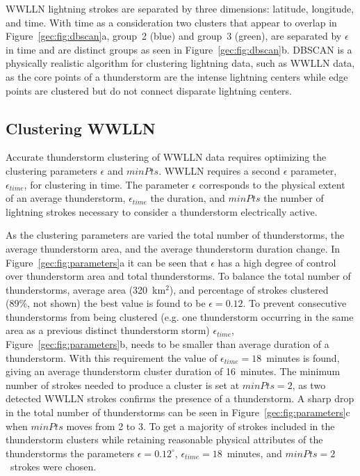 WWLLN lightning strokes are separated by three dimensions: latitude, longitude, and time.
With time as a consideration two clusters that appear to overlap in Figure~\ref{gec:fig:dbscan}a, group~2 (blue) and group~3 (green), are separated by $\epsilon$ in time and are distinct groups as seen in Figure~\ref{gec:fig:dbscan}b.
DBSCAN is a physically realistic algorithm for clustering lightning data, such as WWLLN data, as the core points of a thunderstorm are the intense lightning centers while edge points are clustered but do not connect disparate lightning centers.

\subsection{Clustering WWLLN}

Accurate thunderstorm clustering of WWLLN data requires optimizing the clustering parameters $\epsilon$ and $minPts$.
WWLLN requires a second $\epsilon$ parameter, $\epsilon_{time}$, for clustering in time.
The parameter $\epsilon$ corresponds to the physical extent of an average thunderstorm, $\epsilon_{time}$ the duration, and $minPts$ the number of lightning strokes necessary to consider a thunderstorm electrically active.

As the clustering parameters are varied the total number of thunderstorms, the average thunderstorm area, and the average thunderstorm duration change.
In Figure~\ref{gec:fig:parameters}a it can be seen that $\epsilon$ has a high degree of control over thunderstorm area and total thunderstorms.
To balance the total number of thunderstorms, average area (320~km$^2$), and percentage of strokes clustered (89\%, not shown) the best value is found to be $\epsilon = 0.12$.
To prevent consecutive thunderstorms from being clustered (e.g. one thunderstorm occurring in the same area as a previous distinct thunderstorm storm) $\epsilon_{time}$, Figure~\ref{gec:fig:parameters}b, needs to be smaller than average duration of a thunderstorm.
With this requirement the value of $\epsilon_{time} = 18$~minutes is found, giving an average thunderstorm cluster duration of 16~minutes.
The minimum number of strokes needed to produce a cluster is set at $minPts = 2$, as two detected WWLLN strokes confirms the presence of a thunderstorm.
A sharp drop in the total number of thunderstorms can be seen in Figure~\ref{gec:fig:parameters}c when $minPts$ moves from 2 to 3.
To get a majority of strokes included in the thunderstorm clusters while retaining reasonable physical attributes of the thunderstorms the parameters $\epsilon = 0.12^\circ$, $\epsilon_{time} = 18$~minutes, and $minPts = 2$~strokes were chosen.
 
